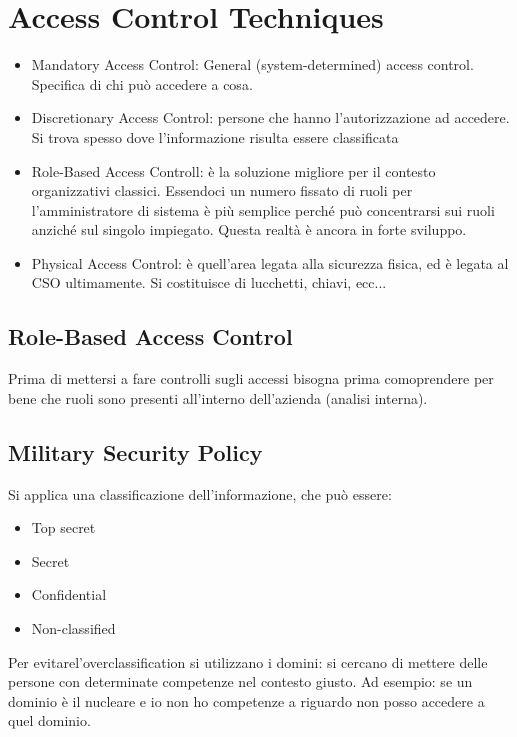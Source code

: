 \chapter{Access Control Techniques}
\begin{itemize}
 \item Mandatory Access Control: General (system-determined) access control. 
 Specifica di chi può accedere a cosa.
 \item Discretionary Access Control: persone che hanno l'autorizzazione ad 
 accedere. Si trova spesso dove l'informazione risulta essere classificata
 \item Role-Based Access Controll: è la soluzione migliore per il contesto 
 organizzativi classici. Essendoci un numero fissato di ruoli per 
 l'amministratore di sistema è più semplice perché può concentrarsi sui ruoli 
 anziché sul singolo impiegato. Questa realtà è ancora in forte sviluppo.
 \item Physical Access Control: è quell'area legata alla sicurezza fisica, ed è 
 legata al CSO ultimamente. Si costituisce di lucchetti, chiavi, ecc...
\end{itemize}


\section{Role-Based Access Control}

Prima di mettersi a fare controlli sugli accessi bisogna prima comoprendere per 
bene che ruoli sono presenti all'interno dell'azienda (analisi interna).


\section{Military Security Policy}

Si applica una classificazione dell'informazione, che può essere:
\begin{itemize}
 \item Top secret
 \item Secret
 \item Confidential
 \item Non-classified
 
\end{itemize}

Per evitarel'overclassification si utilizzano i domini: si cercano di mettere 
delle persone con determinate competenze nel contesto giusto.
Ad esempio: se un dominio è il nucleare e io non ho competenze a riguardo non 
posso accedere a quel dominio.

